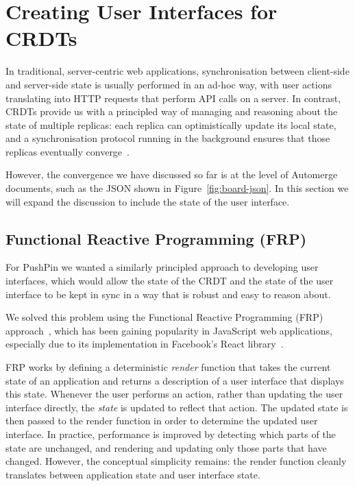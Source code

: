 \documentclass[sigplan,10pt]{acmart}
\begin{document}
\section{Creating User Interfaces for CRDTs}\label{sec:data-model-ui}

In traditional, server-centric web applications, synchronisation between client-side and server-side state is usually performed in an ad-hoc way, with user actions translating into HTTP requests that perform API calls on a server.
In contrast, CRDTs provide us with a principled way of managing and reasoning about the state of multiple replicas: each replica can optimistically update its local state, and a synchronisation protocol running in the background ensures that those replicas eventually converge~\cite{Saito:2005jw}.

However, the convergence we have discussed so far is at the level of Automerge documents, such as the JSON shown in Figure~\ref{fig:board-json}.
In this section we will expand the discussion to include the state of the user interface.

\subsection{Functional Reactive Programming (FRP)}

For PushPin we wanted a similarly principled approach to developing user interfaces, which would allow the state of the CRDT and the state of the user interface to be kept in sync in a way that is robust and easy to reason about.

We solved this problem using the Functional Reactive Programming (FRP) approach~\cite{Czaplicki:2013ig}, which has been gaining popularity in JavaScript web applications, especially due to its implementation in Facebook's React library~\cite{React}.

FRP works by defining a deterministic \emph{render} function that takes the current state of an application and returns a description of a user interface that displays this state.
Whenever the user performs an action, rather than updating the user interface directly, the \emph{state} is updated to reflect that action.
The updated state is then passed to the render function in order to determine the updated user interface.
In practice, performance is improved by detecting which parts of the state are unchanged, and rendering and updating only those parts that have changed.
However, the conceptual simplicity remains: the render function cleanly translates between application state and user interface state.
\end{document}
